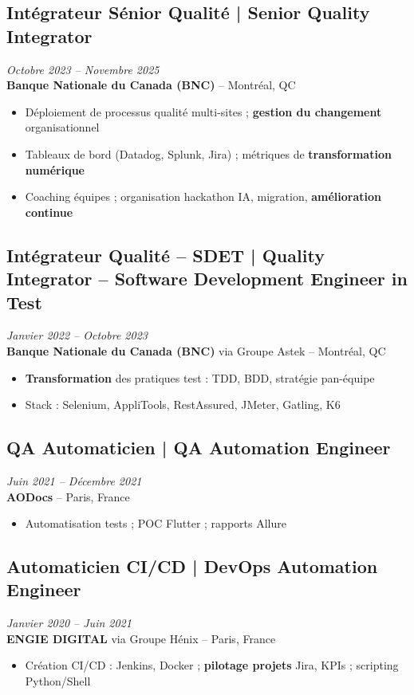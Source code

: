 \documentclass[11pt,a4paper]{article}
\begin{document}
\subsection*{Intégrateur Sénior Qualité | Senior Quality Integrator} \hfill \textit{Octobre 2023 -- Novembre 2025}\\
\textbf{Banque Nationale du Canada (BNC)} -- Montréal, QC\\
\begin{itemize}
    \item Déploiement de processus qualité multi-sites ; \textbf{gestion du changement} organisationnel
    \item Tableaux de bord (Datadog, Splunk, Jira) ; métriques de \textbf{transformation numérique}
    \item Coaching équipes ; organisation hackathon IA, migration, \textbf{amélioration continue}
\end{itemize}

\subsection*{Intégrateur Qualité -- SDET | Quality Integrator -- Software Development Engineer in Test} \hfill \textit{Janvier 2022 -- Octobre 2023}\\
\textbf{Banque Nationale du Canada (BNC)} via Groupe Astek -- Montréal, QC\\
\begin{itemize}
    \item \textbf{Transformation} des pratiques test : TDD, BDD, stratégie pan-équipe
    \item Stack : Selenium, AppliTools, RestAssured, JMeter, Gatling, K6
\end{itemize}

\subsection*{QA Automaticien | QA Automation Engineer} \hfill \textit{Juin 2021 -- Décembre 2021}\\
\textbf{AODocs} -- Paris, France\\
\begin{itemize}
    \item Automatisation tests ; POC Flutter ; rapports Allure
\end{itemize}

\subsection*{Automaticien CI/CD | DevOps Automation Engineer} \hfill \textit{Janvier 2020 -- Juin 2021}\\
\textbf{ENGIE DIGITAL} via Groupe Hénix -- Paris, France\\
\begin{itemize}
    \item Création CI/CD : Jenkins, Docker ; \textbf{pilotage projets} Jira, KPIs ; scripting Python/Shell
\end{itemize}
\end{document}
